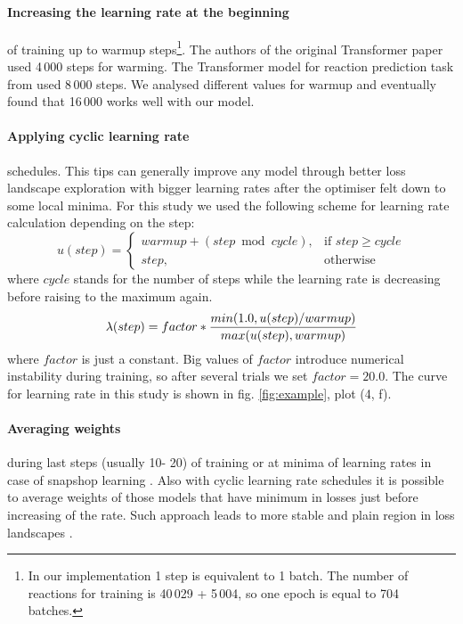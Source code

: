 \documentclass{article}
\begin{document}
\paragraph{Increasing the learning rate at the beginning} of training up to warmup steps\footnote{In our implementation 1 step is equivalent to 1 batch. The number of reactions for training is 40\,029 + 5\,004, so one epoch is equal to 704 batches.}. The authors of the original Transformer paper \cite{Transformer}  used 4\,000 steps for warming. The Transformer model for reaction prediction task from \cite{SchwallerTransformer} used 8\,000 steps. We analysed different values for warmup and eventually found that 16\,000 works well with our model.
\paragraph{Applying cyclic learning rate} schedules. This tips can generally improve any model \cite{Izmailov} through better loss landscape exploration with bigger learning rates after the optimiser felt down to some local minima. For this study we used the following scheme for learning rate calculation depending on the step:
\[
    u(step)= 
\begin{cases}
    warmup + (step \bmod cycle), & \text{if } step \ge cycle\\
    step,              & \text{otherwise}
\end{cases}
\]
where $cycle$ stands for the number of steps while the learning rate is decreasing before raising to the maximum again.
\begin{equation}
\label{eq:rate}
\lambda(step) = factor * { {min (1.0, u(step) / warmup ) } \over { max (u(step), warmup) } }
\end{equation}	
where $factor$ is just a constant. Big values of $factor$ introduce numerical instability during training, so after several trials we set $factor = 20.0$. The curve for learning rate in this study is shown in fig. \ref{fig:example}, plot (4, f). 
\paragraph{Averaging weights} during last steps (usually 10- 20) of training or at minima of learning rates in case of snapshop learning \cite{Snapshot}. Also with cyclic learning rate schedules it is possible to average weights of those models that have minimum in losses just before increasing of the rate. Such approach leads to more stable and plain region in loss landscapes \cite{Izmailov}. 
\end{document}

